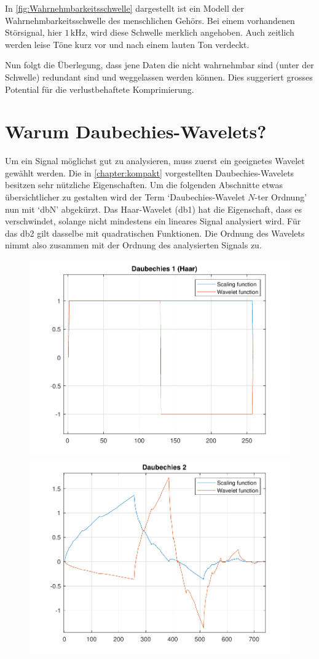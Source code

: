\begin{refsection}
In \autoref{fig:Wahrnehmbarkeitsschwelle} dargestellt ist ein Modell der Wahrnehmbarkeitsschwelle des menschlichen Gehörs.
Bei einem vorhandenen Störsignal, hier $1\,\text{kHz}$, wird diese Schwelle merklich angehoben.
Auch zeitlich werden leise Töne kurz vor und nach einem lauten Ton verdeckt.\cite{wikipedia:Psychoakustik}

Nun folgt die Überlegung, dass jene Daten die nicht wahrnehmbar sind (unter der Schwelle) redundant sind und weggelassen werden können.
Dies suggeriert grosses Potential für die verlustbehaftete Komprimierung.

\section{Warum Daubechies-Wavelets?}
\label{chapter:daubechies}
Um ein Signal möglichst gut zu analysieren, muss zuerst ein geeignetes Wavelet gewählt werden.
Die in \autoref{chapter:kompakt} vorgestellten Daubechies-Wavelets besitzen sehr nützliche Eigenschaften.
Um die folgenden Abschnitte etwas übersichtlicher zu gestalten wird der Term `Daubechies-Wavelet $N$-ter Ordnung' nun mit `dbN' abgekürzt.
Das Haar-Wavelet (db1) hat die Eigenschaft, dass es verschwindet, solange nicht mindestens ein lineares Signal analysiert wird.
Für das db2 gilt dasselbe mit quadratischen Funktionen. 
Die Ordnung des Wavelets nimmt also zusammen mit der Ordnung des analysierten Signals zu.
\begin{figure}
	\includegraphics[width=0.5\linewidth]{papers/compress/Bilder/db1}
	\includegraphics[width=0.5\linewidth]{papers/compress/Bilder/db2}

\end{figure}
\end{refsection}
